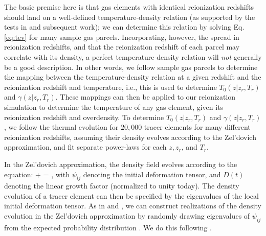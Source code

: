 The basic premise here is that gas elements with identical reionization redshifts should land on a well-defined temperature-density
relation (as supported by the tests in \citealt{Hui:1997dp} and subsequent work); we can determine this relation by solving Eq. \ref{eq:tev} for many sample gas parcels.
Incorporating, however, the spread in reionization redshifts, and that the reionization redshift of each parcel may
correlate with its density, a perfect temperature-density relation will {\em not} generally be a good description. In other words,
we follow sample gas parcels to determine the mapping between the temperature-density relation at a given redshift and
the reionization redshift and temperature, i.e., this is used to determine $T_0(z|z_r,T_r)$ and $\gamma(z|z_r, T_r)$. These
mappings can then be applied to our reionization simulation to determine the temperature of any gas element, given its
reionization redshift and overdensity. To determine $T_0(z|z_r,T_r)$ and $\gamma(z|z_r,T_r)$, we follow the thermal evolution for $20,000$ tracer elements
for many different
reionization redshifts, assuming their density evolves according to the Zel'dovich approximation, and fit separate power-laws
for each $z, z_r$, and $T_r$. 

In the Zel'dovich approximation, the density field evolves according to the equation:
 + \delta = ,
\label{eq:zeldo}
\eeqa
with $\psi_{ij}$ denoting the initial deformation tensor, and $D(t)$ denoting the linear growth factor (normalized to unity today). The density evolution of a tracer element can then be specified by the eigenvalues of the local initial deformation 
tensor.  
As in \citet{Hui:1997dp} and \citet{1995ApJ...449..476R}, we can construct realizations of the density evolution in the Zel'dovich approximation 
by randomly drawing eigenvalues of $\psi_{ij}$ from the expected probability distribution \citep{1970Afz.....6..581D}. We do this following \citet{Hui:1999ku,Bertschinger:1993zv}. 


